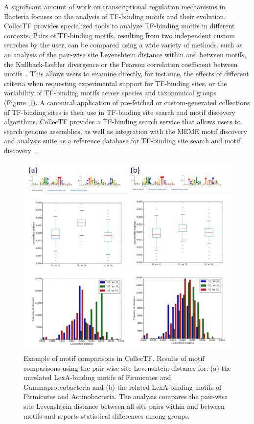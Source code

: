 A significant amount of work on transcriptional regulation mechanisms in
Bacteria focuses on the analysis of TF-binding motifs and their
evolution. CollecTF provides specialized tools to analyze TF-binding motifs in
different contexts. Pairs of TF-binding motifs, resulting from two independent
custom searches by the user, can be compared using a wide variety of methods,
such as an analysis of the pair-wise site Levenshtein distance within and
between motifs, the Kullback-Leibler divergence or the Pearson correlation
coefficient between motifs~\citep{vanet1999promoter, mahony2007stamp}. This
allows users to examine directly, for instance, the effects of different
criteria when requesting experimental support for TF-binding sites, or the
variability of TF-binding motifs across species and taxonomical groups
(Figure~\ref{fig:motif-comparison}). A canonical application of pre-fetched or
custom-generated collections of TF-binding sites is their use in TF-binding
site search and motif discovery algorithms. CollecTF provides a TF-binding
search service that allows users to search genome assemblies, as well as
integration with the MEME motif discovery and analysis suite as a reference database for
TF-binding site search and motif discovery~\citep{bailey2006meme}.

\begin{figure}
  \centering
  \includegraphics[width=\textwidth]{figures/chapter2/motif-comparison}
  \caption[Example of motif comparisons in CollecTF.]{Example of motif
    comparisons in CollecTF\@. Results of motif comparisons using the pair-wise
    site Levenshtein distance for: (a) the unrelated LexA-binding motifs of
    Firmicutes and Gammaproteobacteria and (b) the related LexA-binding motifs
    of Firmicutes and Actinobacteria. The analysis compares the pair-wise site
    Levenshtein distance between all site pairs within and between motifs and
    reports statistical differences among groups.}
\label{fig:motif-comparison}
\end{figure}

